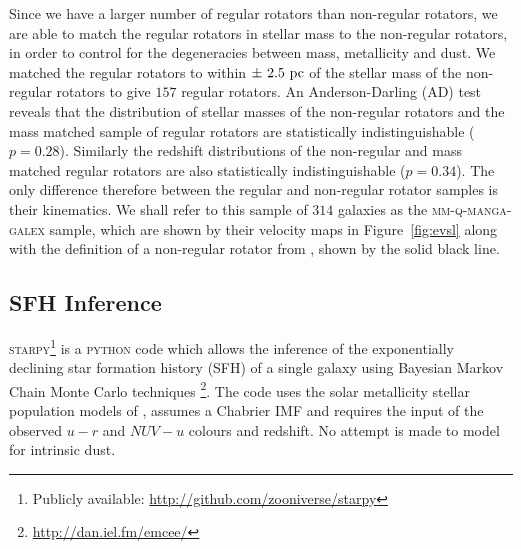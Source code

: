 \documentclass[useAMS,usenatbib]{mn2e}
\begin{document}
Since we have a larger number of regular rotators than non-regular rotators, we are able to match the regular rotators in stellar mass to the non-regular rotators, in order to control for the degeneracies between mass, metallicity and dust. We matched the regular rotators to within $\pm~2.5~\rm{pc}$ of the stellar mass of the non-regular rotators to give $157$ regular rotators. An Anderson-Darling (AD) test reveals that the distribution of stellar masses of the non-regular rotators and the mass matched sample of regular rotators are statistically indistinguishable ($p=0.28$). Similarly the redshift distributions of the non-regular and mass matched regular rotators are also statistically indistinguishable ($p=0.34$). The only difference therefore between the regular and non-regular rotator samples is their kinematics. We shall refer to this sample of $314$ galaxies as the \textsc{mm-q-manga-galex} sample, which are shown by their velocity maps in Figure~\ref{fig:evsl} along with the definition of a non-regular rotator from \cite{cappellari16}, shown by the solid black line. 


\subsection{SFH Inference}\label{sec:starpy}

\textsc{starpy}\footnote{Publicly available: \url{http://github.com/zooniverse/starpy}} is a \textsc{python} code which allows the inference of the exponentially declining star formation history (SFH) of a single galaxy using  Bayesian Markov Chain Monte Carlo techniques \citep{emcee13}\footnote{\url{http://dan.iel.fm/emcee/}}. The code uses the solar metallicity stellar population models of \cite[][hereafter BC03]{BC03}, assumes a Chabrier IMF \citep{chabrier03} and requires the input of the observed $u-r$ and $NUV-u$ colours and redshift. No attempt is made to model for intrinsic dust. 
\end{document}
